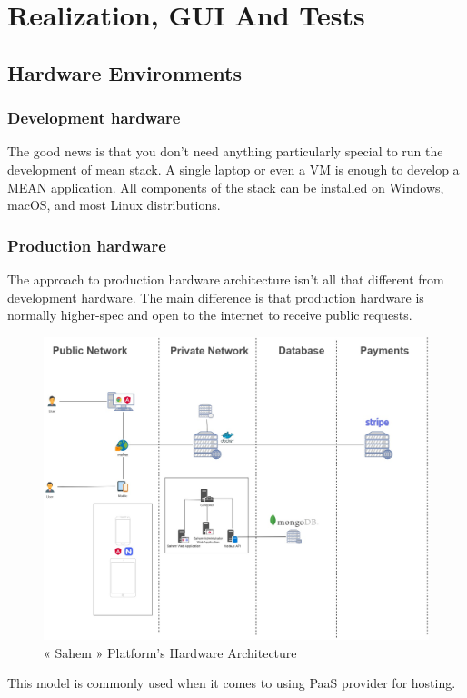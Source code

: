 

\setcounter{mtc}{12}

\chapter{Realization, GUI And Tests}%
\label{chap:chapter_four}
\minitoc

\section{Hardware Environments}

\subsection{Development hardware }
The good news is that you don’t need anything particularly special to run the development of mean stack. A single laptop or even a \ac{VM} is enough to develop a MEAN application. All components of the stack can be installed on Windows, macOS, and most Linux distributions.

\subsection{Production hardware }
The approach to production hardware architecture isn’t all that different from development hardware. The main difference is that production hardware is normally higher-spec and open to the internet to receive public requests.

\begin{figure}[!ht]
      \centering
      \includegraphics[scale=0.25]{assets/architecturedrawio.jpg}
      \caption{« Sahem » Platform's Hardware Architecture}
      \label{fig:sahemarchitecturedrawio}
\end{figure}
This model is commonly used when it comes to using \ac{PaaS} provider for hosting.
